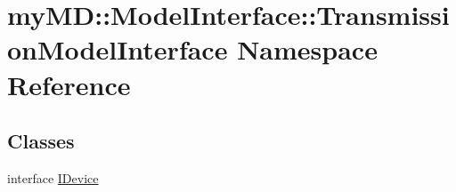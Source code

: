 \hypertarget{namespacemy_m_d_1_1_model_interface_1_1_transmission_model_interface}{
\section{my\-MD::Model\-Interface::Transmission\-Model\-Interface Namespace Reference}
\label{d7/dd5/namespacemy_m_d_1_1_model_interface_1_1_transmission_model_interface}
}


\subsection*{Classes}
\begin{CompactItemize}
\item 
interface \hyperlink{interfacemy_m_d_1_1_model_interface_1_1_transmission_model_interface_1_1_i_device}{IDevice}
\end{CompactItemize}
